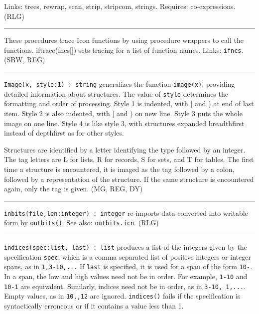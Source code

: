 Links: \textsf{trees, rewrap, scan, strip, stripcom, strings}. Requires:
co-expressions. (RLG)

\vspace{0.25cm}\hrule{}

These procedures trace Icon functions by using procedure
wrappers to call the functions. iftrace(fncs[]) sets tracing for a list
of function names. Links: \texttt{ifncs}. (SBW, REG)

\vspace{0.25cm}\hrule{}

\texttt{Image(x, style:1) : string} generalizes the function
\texttt{image(x)}, providing detailed information about structures. The
value of \texttt{style} determines the formatting and order of
processing. Style 1 is indented, with ] and ) at end of last item.
Style 2 is also indented, with ] and ) on new line. Style 3 puts the
whole image on one line. Style 4 is like style 3, with structures
expanded breadthfirst instead of depthfirst as for other styles.

Structures are identified by a letter identifying the type followed by
an integer. The tag letters are {\textquotedbl}L{\textquotedbl} for
lists, {\textquotedbl}R{\textquotedbl} for records,
{\textquotedbl}S{\textquotedbl} for sets, and
{\textquotedbl}T{\textquotedbl} for tables. The first time a structure
is encountered, it is imaged as the tag followed by a colon, followed
by a representation of the structure. If the same structure is
encountered again, only the tag is given. (MG, REG, DY)

\vspace{0.25cm}\hrule{}

\texttt{inbits(file,len:integer) : integer} re-imports data converted
into writable form by \texttt{outbits()}. See also:
\texttt{outbits.icn}. (RLG)

\vspace{0.25cm}\hrule{}

\texttt{indices(spec:list, last) : list} produces a list of the integers
given by the specification \texttt{spec}, which is a comma separated
list of positive integers or integer spans, as in
\texttt{{\textquotedbl}1,3-10,...{\textquotedbl}} If \texttt{last} is
specified, it is used for a span of the form
\texttt{{\textquotedbl}10-{\textquotedbl}}. In a span, the low and high
values need not be in order. For example,
\texttt{{\textquotedbl}1-10{\textquotedbl}} and
\texttt{{\textquotedbl}10-1{\textquotedbl}} are equivalent. Similarly,
indices need not be in order, as in \texttt{{\textquotedbl}3-10,
1,...{\textquotedbl}}. Empty values, as in
\texttt{{\textquotedbl}10,,12{\textquotedbl}} are ignored.
\texttt{indices()} fails if the specification is syntactically
erroneous or if it contains a value less than 1. 

